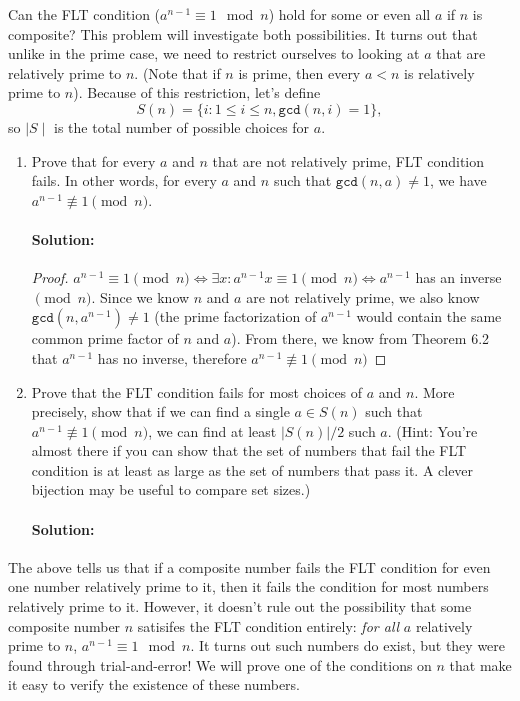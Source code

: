 \documentclass[11pt, notitlepage]{report}
\newenvironment{solution}{\paragraph{Solution:}}{\hfill}
\begin{document}
Can the FLT condition ($a^{n-1} \equiv 1 \mod n$) hold for some or even all $a$ if $n$ is composite? This problem will investigate both possibilities. 
It turns out that unlike in the prime case, we need to restrict ourselves to looking at $a$ that are relatively prime to $n$. (Note that if $n$ is prime, then every $a<n$ is relatively prime to $n$). Because of this restriction, let's define $$S(n) =  \{i: 1 \leq i \leq n, \texttt{gcd}(n,i) = 1\},$$ so $\mid S \mid$ is the total number of possible choices for $a$.
\begin{enumerate}[label=(\alph*)]
\item Prove that for every $a$ and $n$ that are not relatively prime, FLT condition fails. In other words, for every $a$ and $n$ such that $\texttt{gcd}(n,a) \neq 1$, we have $a^{n-1} \not\equiv 1 \pmod{n}$.
	\begin{solution}
		\begin{proof}
			$a^{n-1} \equiv 1 \pmod{n} 	\iff \exists x:a^{n-1}x\equiv 1\pmod{n} \iff a^{n-1}$ has an inverse $\pmod{n}$. Since we know $n$ and $a$ are not relatively prime, we also know $\texttt{gcd}(n,a^{n-1}) \neq 1$ (the prime factorization of $a^{n-1}$ would contain the same common prime factor of $n$ and $a$). From there, we know from Theorem 6.2 that $a^{n-1}$ has no inverse, therefore $a^{n-1} \not\equiv 1 \pmod{n}$
		\end{proof}
	\end{solution}

    \item Prove that the FLT condition fails for most choices of $a$ and $n$. More precisely, show that if we can find a single $a \in S(n)$ such that $a^{n-1} \not \equiv 1 \pmod{n}$, we can find at least $|S(n)|/2$ such $a$. (Hint: You're almost there if you can show that the set of numbers that fail the FLT condition is at least as large as the set of numbers that pass it. A clever bijection may be useful to compare set sizes.)
	\begin{solution}
		
	\end{solution}
\end{enumerate}
The above tells us that if a composite number fails the FLT condition for even one number relatively prime to it, then it fails the condition for most numbers relatively prime to it. However, it doesn't rule out the possibility that some composite number $n$ satisifes the FLT condition entirely: \emph{for all} $a$ relatively prime to $n$, $a^{n-1}\equiv 1 \mod n$. It turns out such numbers do exist, but they were found through trial-and-error! We will prove one of the conditions on $n$ that make it easy to verify the existence of these numbers.
\end{document}
